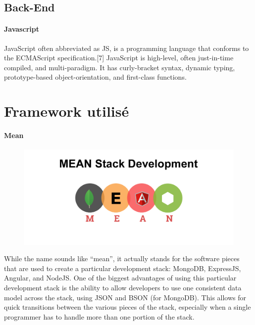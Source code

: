 \subsection{Back-End}
\paragraph{Javascript}
JavaScript often abbreviated as JS, is a programming language that conforms to the ECMAScript specification.[7] JavaScript is high-level, often just-in-time compiled, and multi-paradigm. It has curly-bracket syntax, dynamic typing, prototype-based object-orientation, and first-class functions.

\section{Framework utilisé}
\paragraph{Mean}

\begin{figure}[!ht]
      \center
      \includegraphics[scale=0.30]{assets/meanstack.png}
\end{figure}

While the name sounds like “mean”, it actually stands for the software pieces that are used to create a particular development stack: MongoDB, ExpressJS, Angular, and NodeJS. One of the biggest advantages of using this particular development stack is the ability to allow developers to use one consistent data model across the stack, using JSON and BSON (for MongoDB). This allows for quick transitions between the various pieces of the stack, especially when a single programmer has to handle more than one portion of the stack.

